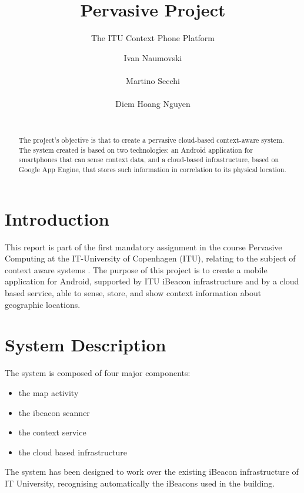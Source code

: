 \documentclass{sigchi}
\begin{document}
\title{Pervasive Project}
\subtitle{The ITU Context Phone Platform}

\author{
  \alignauthor Ivan Naumovski\\
    \\
  \alignauthor Martino Secchi\\
    \\
  \alignauthor Diem Hoang Nguyen\\
    \\
}

\maketitle

\begin{abstract}
The project's objective is that to create a pervasive cloud-based context-aware system. 
The system created is based on two technologies: an Android application for smartphones that can sense context data, and a cloud-based infrastructure, based on Google App Engine, that stores such information in correlation to its physical location.
\end{abstract}



\section{Introduction}
This report is part of the first mandatory assignment in the course Pervasive Computing at the IT-University of Copenhagen (ITU), relating to the subject of context aware systems \cite{Schilit:1994:CACA}.
 The purpose of this project is to create a mobile application for Android, supported by ITU iBeacon infrastructure and by a  cloud based service, able to sense, store, and show context information about geographic locations. 
 
 \section{System Description}

The system is composed of four major components:
\begin{itemize}
\item the map activity
\item the ibeacon scanner
\item the context service
\item the cloud based infrastructure
\end{itemize}
The system has been designed to work over the existing iBeacon infrastructure of IT University, recognising automatically the iBeacons used in the building.
\end{document}
